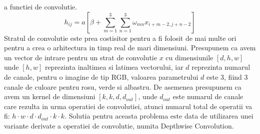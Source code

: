 \documentclass[12pt,a4paper]{report}
\begin{document}
a functiei de convolutie. 
\begin{equation}
h_{ij} = a \left[ \beta + \sum_{m=1}^{3} \sum_{n=1}^{3} \omega_{mn} x_{i+m-2, j+n-2} \right]
\end{equation}
Stratul de convolutie este prea costisitor pentru a fi folosit de mai multe ori pentru 
a crea o arhitectura in timp real de mari dimensiuni. Presupunem ca avem  un vector
de intrare pentru un strat de convolutie \(x\) cu dimensiunile \([d, h, w]\) unde \([h,w]\)
reprezinta inaltimea si latimea vectorului, iar \(d\) reprezinta numarul de canale, pentru o 
imagine de tip RGB, valoarea parametrului \(d\) este 3, fiind 3 canale de culoare pentru rosu, 
verde si albastru. De asemenea presupunem ca avem un kernel de dimensiuni \([k, k, d, d_{out}]\),
unde \(d_{out}\) este numarul de canale care rezulta in urma operatiei de convolutiei, atunci
numarul total de operatii va fi: $ h \cdot w \cdot d \cdot d_{out} \cdot k \cdot k$. 
Solutia pentru aceasta problema este data de utilizarea unei variante derivate a operatiei de 
convolutie, numita Depthwise Convolution.
\end{document}
